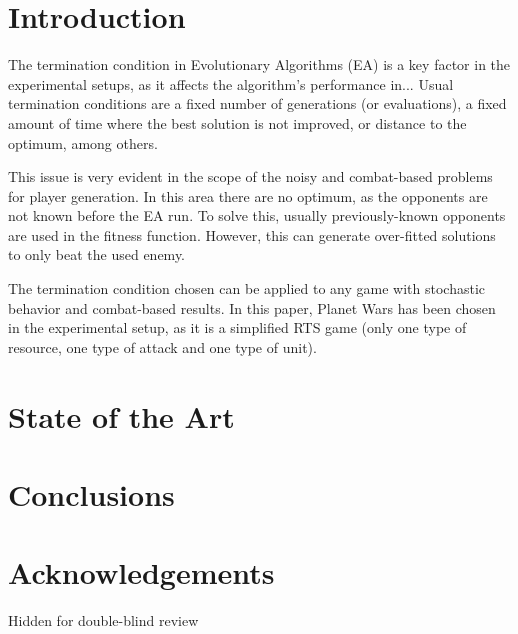\documentclass[runningheads,a4paper]{llncs}
\begin{document}
\section{Introduction}

The termination condition in Evolutionary Algorithms (EA) is a key factor in the experimental setups, as it affects the algorithm's performance in... Usual termination conditions are a fixed number of generations (or evaluations), a fixed amount of time where the best solution is not improved, or distance to the optimum, among others.

This issue is very evident in the scope of the noisy and combat-based problems for player generation. In this area there are no optimum, as the opponents are not known before the EA run. To solve this, usually previously-known opponents are used in the fitness function. However, this can generate over-fitted solutions to only beat the used enemy.

The termination condition chosen can be applied to any game with stochastic behavior and combat-based results. In this paper, Planet Wars has been chosen in the experimental setup, as it is a simplified RTS game (only one type of resource, one type of attack and one type of unit).

\section{State of the Art}

\section{Conclusions}

\section*{Acknowledgements}

Hidden for double-blind review



\end{document}
